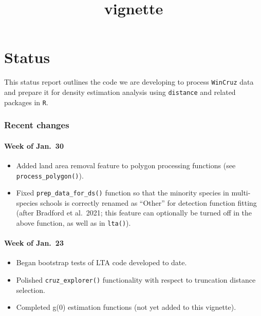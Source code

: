 \documentclass[
]{book}
\title{vignette}
\author{}
\date{\vspace{-2.5em}}
\begin{document}
\maketitle

{
\setcounter{tocdepth}{1}
\tableofcontents
}
\hypertarget{status}{%
\chapter{Status}\label{status}}

This status report outlines the code we are developing to process \texttt{WinCruz} data and prepare it for density estimation analysis using \texttt{distance} and related packages in \texttt{R}.

\hypertarget{recent-changes}{%
\subsection*{Recent changes}\label{recent-changes}}

\hypertarget{week-of-jan.-30}{%
\subsubsection*{Week of Jan.~30}\label{week-of-jan.-30}}

\begin{itemize}
\item
  Added land area removal feature to polygon processing functions (see \texttt{process\_polygon()}).
\item
  Fixed \texttt{prep\_data\_for\_ds()} function so that the minority species in multi-species schools is correctly renamed as ``Other'' for detection function fitting (after Bradford et al.~2021; this feature can optionally be turned off in the above function, as well as in \texttt{lta()}).
\end{itemize}

\hypertarget{week-of-jan.-23}{%
\subsubsection*{Week of Jan.~23}\label{week-of-jan.-23}}

\begin{itemize}
\item
  Began bootstrap tests of LTA code developed to date.
\item
  Polished \texttt{cruz\_explorer()} functionality with respect to truncation distance selection.
\item
  Completed g(0) estimation functions (not yet added to this vignette).
\end{itemize}
\end{document}
